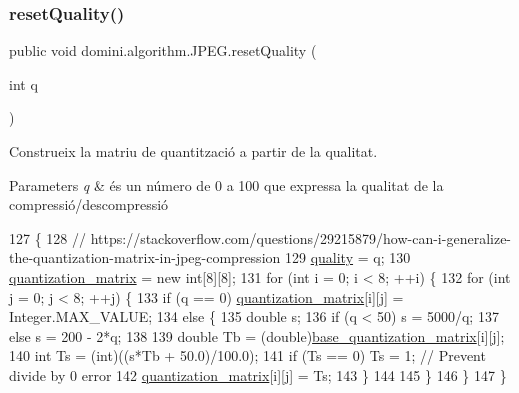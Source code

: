 \subsubsection{\texorpdfstring{reset\+Quality()}{resetQuality()}}
{\footnotesize\ttfamily public void domini.\+algorithm.\+J\+P\+E\+G.\+reset\+Quality (\begin{DoxyParamCaption}\item[{int}]{q }\end{DoxyParamCaption})\hspace{0.3cm}{\ttfamily [inline]}}



Construeix la matriu de quantització a partir de la qualitat. 


\begin{DoxyParams}{Parameters}
{\em q} & és un número de 0 a 100 que expressa la qualitat de la compressió/descompressió \\
\hline
\end{DoxyParams}

\begin{DoxyCode}
127                                     \{
128         \textcolor{comment}{//
       https://stackoverflow.com/questions/29215879/how-can-i-generalize-the-quantization-matrix-in-jpeg-compression}
129         \hyperlink{classdomini_1_1algorithm_1_1JPEG_ae80176d5ff56e613643db55e21c513da}{quality} = q;
130         \hyperlink{classdomini_1_1algorithm_1_1JPEG_a7c95eb140dbe185a31b402d48ec17a66}{quantization\_matrix} = \textcolor{keyword}{new} \textcolor{keywordtype}{int}[8][8];
131         \textcolor{keywordflow}{for} (\textcolor{keywordtype}{int} i = 0; i < 8; ++i) \{
132             \textcolor{keywordflow}{for} (\textcolor{keywordtype}{int} j = 0; j < 8; ++j) \{
133                 \textcolor{keywordflow}{if} (q == 0) \hyperlink{classdomini_1_1algorithm_1_1JPEG_a7c95eb140dbe185a31b402d48ec17a66}{quantization\_matrix}[i][j] = Integer.MAX\_VALUE;
134                 \textcolor{keywordflow}{else} \{
135                     \textcolor{keywordtype}{double} s;
136                     \textcolor{keywordflow}{if} (q < 50) s = 5000/q;
137                     \textcolor{keywordflow}{else} s = 200 - 2*q;
138 
139                     \textcolor{keywordtype}{double} Tb = (double)\hyperlink{classdomini_1_1algorithm_1_1JPEG_a1f91c0bad6cfd3ac22bec68bc28564c5}{base\_quantization\_matrix}[i][j];
140                     \textcolor{keywordtype}{int} Ts = (int)((s*Tb + 50.0)/100.0);
141                     \textcolor{keywordflow}{if} (Ts == 0) Ts = 1; \textcolor{comment}{// Prevent divide by 0 error}
142                     \hyperlink{classdomini_1_1algorithm_1_1JPEG_a7c95eb140dbe185a31b402d48ec17a66}{quantization\_matrix}[i][j] = Ts;
143                 \}
144 
145             \}
146         \}
147     \}
\end{DoxyCode}
\mbox{\label{classdomini_1_1algorithm_1_1JPEG_aa9c52789d61d5eebdeb13ee39f8e817d}} 

